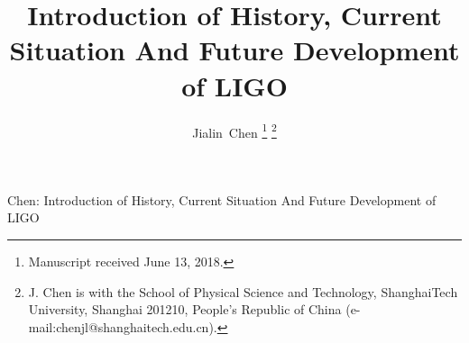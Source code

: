 \documentclass[journal,comsoc,twoside]{IEEEtran}
\begin{document}
%
\title{Introduction of History, Current Situation And Future Development of LIGO}
%
%
%

\author{Jialin~Chen%
\thanks{Manuscript received June 13, 2018.}%
\thanks{J. Chen is with the School of Physical Science and Technology, ShanghaiTech University, Shanghai 201210, People's Republic of China (e-mail:chenjl@shanghaitech.edu.cn).}}

%
%



%
{Chen: Introduction of History, Current Situation And Future Development of LIGO}
%
\end{document}
